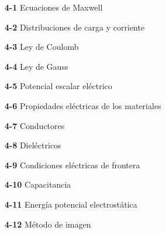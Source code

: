 \begin{minipage}[c]{0.6\textwidth}
\begin{flushleft}
        \begin{minipage}{0.6\textwidth} %
        \raggedright
        \linespread{1.5}\selectfont %
            \begin{itemize}
                \item[\textbf{4-1}] Ecuaciones de Maxwell
                \item[\textbf{4-2}] Distribuciones de carga y corriente
                \item[\textbf{4-3}] Ley de Coulomb
                \item[\textbf{4-4}] Ley de Gauss
                \item[\textbf{4-5}] Potencial escalar eléctrico
                \item[\textbf{4-6}] Propiedades eléctricas de los materiales
                \item[\textbf{4-7}] Conductores
                \item[\textbf{4-8}] Dieléctricos
                \item[\textbf{4-9}] Condiciones eléctricas de frontera
                \item[\textbf{4-10}] Capacitancia
                \item[\textbf{4-11}] Energía potencial electrostática
                \item[\textbf{4-12}] Método de imagen
            \end{itemize}
        \end{minipage}

        \vspace*{\fill} %
    \end{flushleft}
\end{minipage}

\newpage %


